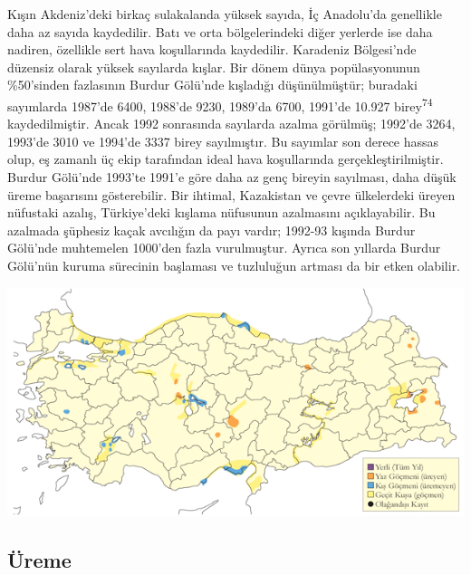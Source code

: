 \documentclass[
  letterpaper,
  DIV=11,
  numbers=noendperiod]{scrreprt}
\begin{document}
Kışın Akdeniz'deki birkaç sulakalanda yüksek sayıda, İç Anadolu'da
genellikle daha az sayıda kaydedilir. Batı ve orta bölgelerindeki diğer
yerlerde ise daha nadiren, özellikle sert hava koşullarında kaydedilir.
Karadeniz Bölgesi'nde düzensiz olarak yüksek sayılarda kışlar. Bir dönem
dünya popülasyonunun \%50'sinden fazlasının Burdur Gölü'nde kışladığı
düşünülmüştür; buradaki sayımlarda 1987'de 6400, 1988'de 9230, 1989'da
6700, 1991'de 10.927 birey\textsuperscript{74} kaydedilmiştir. Ancak
1992 sonrasında sayılarda azalma görülmüş; 1992'de 3264, 1993'de 3010 ve
1994'de 3337 birey sayılmıştır. Bu sayımlar son derece hassas olup, eş
zamanlı üç ekip tarafından ideal hava koşullarında gerçekleştirilmiştir.
Burdur Gölü'nde 1993'te 1991'e göre daha az genç bireyin sayılması, daha
düşük üreme başarısını gösterebilir. Bir ihtimal, Kazakistan ve çevre
ülkelerdeki üreyen nüfustaki azalış, Türkiye'deki kışlama nüfusunun
azalmasını açıklayabilir. Bu azalmada şüphesiz kaçak avcılığın da payı
vardır; 1992-93 kışında Burdur Gölü'nde muhtemelen 1000'den fazla
vurulmuştur. Ayrıca son yıllarda Burdur Gölü'nün kuruma sürecinin
başlaması ve tuzluluğun artması da bir etken olabilir.

\includegraphics{images/harita_Page_035.png}

\hypertarget{uxfcreme-34}{%
\subsection{\texorpdfstring{\textbf{Üreme}}{Üreme}}\label{uxfcreme-34}}
\end{document}
